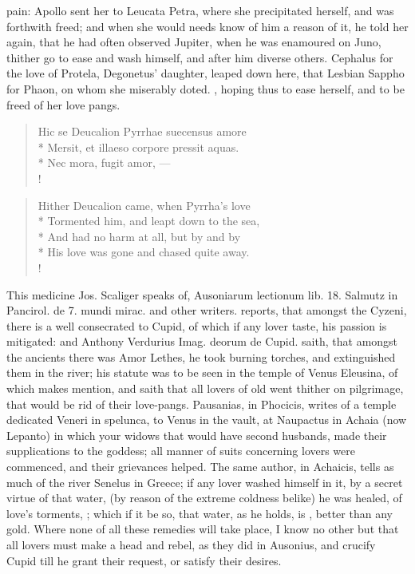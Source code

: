 pain: Apollo sent her to Leucata Petra, where she precipitated herself,
and was forthwith freed; and when she would needs know of him a reason
of it, he told her again, that he had often observed Jupiter,
when he was enamoured on Juno, thither go to ease and wash himself, and
after him diverse others. Cephalus for the love of Protela, Degonetus'
daughter, leaped down here, that Lesbian Sappho for Phaon, on whom she
miserably doted. , hoping thus to ease
herself, and to be freed of her love pangs.
%
\begin{latin}%
\begin{verse}%
Hic se Deucalion Pyrrhae suecensus amore\\*
Mersit, et illaeso corpore pressit aquas.\\*
Nec mora, fugit amor, \etc{}---\\!
\end{verse}%
\end{latin}%
\translationrule%
\begin{verse}%
Hither Deucalion came, when Pyrrha's love\\*
Tormented him, and leapt down to the sea,\\*
And had no harm at all, but by and by\\*
His love was gone and chased quite away.\\!
\end{verse}%
%

This medicine Jos. Scaliger speaks of, \textlatin{Ausoniarum lectionum lib. 18.}
Salmutz in \textlatin{Pancirol. de 7. mundi mirac.} and other writers. \Pliny{}
reports, that amongst the Cyzeni, there is a well consecrated to Cupid,
of which if any lover taste, his passion is mitigated: and Anthony
Verdurius \textlatin{Imag. deorum de Cupid.} saith, that amongst the ancients there
was Amor Lethes, he took burning torches, and extinguished them
in the river; his statute was to be seen in the temple of Venus
Eleusina, of which \Ovid makes mention, and saith that all lovers of old
went thither on pilgrimage, that would be rid of their love-pangs.
Pausanias, in  Phocicis, writes of a temple dedicated Veneri in
spelunca, to Venus in the vault, at Naupactus in Achaia (now Lepanto)
in which your widows that would have second husbands, made their
supplications to the goddess; all manner of suits concerning lovers
were commenced, and their grievances helped. The same author, in
Achaicis, tells as much of the river Senelus in Greece; if any
lover washed himself in it, by a secret virtue of that water, (by
reason of the extreme coldness belike) he was healed, of love's
torments, ; which if it be so,
that water, as he holds, is , better than any gold.
Where none of all these remedies will take place, I know no other but
that all lovers must make a head and rebel, as they did in
Ausonius, and crucify Cupid till he grant their request, or
satisfy their desires.


